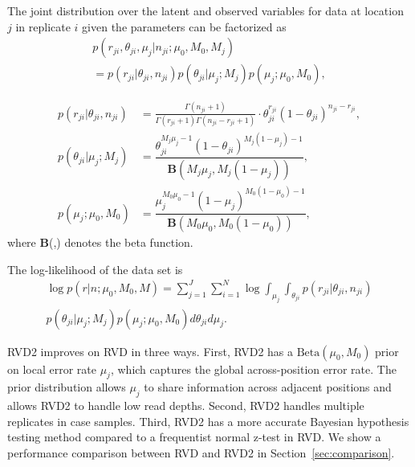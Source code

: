 \documentclass{bioinfo}
\begin{document}
The joint distribution over the latent and observed variables for data at location $j$ in replicate $i$ given the parameters can be factorized as
\begin{multline}\label{eqn:jointpdf}
p \left( r_{ji}, \theta_{ji}, \mu_j | n_{ji}; \mu_0, M_0, M_j \right) \\ = p \left( r_{ji} | \theta_{ji}, n_{ji} \right) p\left( \theta_{ji} | \mu_j; M_j \right) p\left( \mu_j; \mu_0, M_0 \right),
\end{multline}

\begin{align}\nonumber
  p\left( r_{ji} | \theta_{ji}, n_{ji} \right) &= \frac{ \Gamma(n_{ji}+1) } { \Gamma(r_{ji}+1) \Gamma( n_{ji} - r_{ji} + 1 ) } \cdot \theta_{ji}^{r_{ji}} (1 - \theta_{ji})^{n_{ji} - r_{ji}}, \nonumber \\
  p\left( \theta_{ji} | \mu_j; M_j \right) &= \dfrac{ \theta_{ji}^{M_j\mu_j -1} (1 - \theta_{ji})^{M_j ( 1 - \mu_j) - 1}}{\textbf{B}(M_j \mu_j, M_j (1-\mu_j))}, \nonumber \\
  p\left( \mu_j; \mu_0, M_0 \right)  &= \dfrac{\mu_j^{M_0\mu_0 -1} (1 - \mu_j)^{M_0 ( 1 - \mu_0) - 1}}{\textbf{B}(M_0 \mu_0,M_0 (1-\mu_0) )}, \nonumber 
\end{align}
where \textbf{B}(\cdot,\cdot) denotes the beta function.

The log-likelihood of the data set is
\begin{multline}
\log p \left( r | n ; \mu_0, M_0, M \right) = \sum_{j=1}^J \sum_{i=1}^N \log \int_{\mu_j} \int_{\theta_{ji}}  p \left( r_{ji} | \theta_{ji}, n_{ji} \right) \\ p\left( \theta_{ji} | \mu_j; M_j \right) p\left( \mu_j; \mu_0, M_0 \right) d\theta_{ji} d\mu_j.
\end{multline}

\label{Improvement of RVD2}
RVD2 improves on RVD in three ways. First, RVD2 has a $ \text{Beta}(\mu_0, M_0) $ prior on local error rate $ \mu_j $, which captures the global across-position error rate. The prior distribution allows $ \mu_j $ to share information across adjacent positions and allows RVD2 to handle low read depths. Second, RVD2 handles multiple replicates in case samples. Third, RVD2 has a more accurate Bayesian hypothesis testing method compared to a frequentist normal z-test in RVD. We show a performance comparison between RVD and RVD2 in Section~\ref{sec:comparison}.
\end{document}
